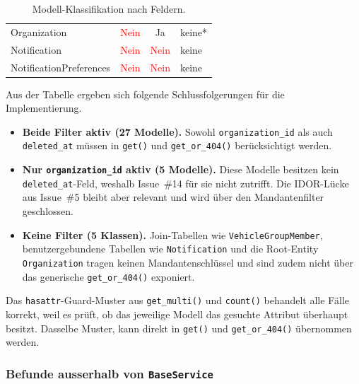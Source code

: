 \begin{table}[H]
\begin{center}
\begin{tabular}{|l|c|c|l|}
            Organization                  & \textcolor{red}{Nein}          & \textcolor{green!60!black}{Ja} & keine*                       \\
            Notification                  & \textcolor{red}{Nein}          & \textcolor{red}{Nein}          & keine                        \\
            NotificationPreferences       & \textcolor{red}{Nein}          & \textcolor{red}{Nein}          & keine                        \\
            \hline
        \end{tabular}
    \end{center}
    \caption{Modell-Klassifikation nach Feldern.}
    \label{tab:model_matrix}
\end{table}

Aus der Tabelle ergeben sich folgende Schlussfolgerungen für die
Implementierung.

\begin{itemize}
    \item \textbf{Beide Filter aktiv (27 Modelle).} Sowohl
          \texttt{organization\_id} als auch \texttt{deleted\_at} müssen in
          \texttt{get()} und \texttt{get\_or\_404()} berücksichtigt werden.
    \item \textbf{Nur \texttt{organization\_id} aktiv (5 Modelle).} Diese
          Modelle besitzen kein \texttt{deleted\_at}-Feld, weshalb Issue~\#14
          für sie nicht zutrifft. Die IDOR-Lücke aus Issue~\#5 bleibt aber
          relevant und wird über den Mandantenfilter geschlossen.
    \item \textbf{Keine Filter (5 Klassen).} Join-Tabellen wie
          \texttt{VehicleGroupMember}, benutzergebundene Tabellen wie
          \texttt{Notification} und die Root-Entity \texttt{Organization}
          tragen keinen Mandantenschlüssel und sind zudem nicht über das
          generische \texttt{get\_or\_404()} exponiert.
\end{itemize}

Das \texttt{hasattr}-Guard-Muster aus \texttt{get\_multi()} und \texttt{count()}
behandelt alle Fälle korrekt, weil es prüft, ob das jeweilige Modell das
gesuchte Attribut überhaupt besitzt. Dasselbe Muster, kann direkt in \texttt{get()} und \texttt{get\_or\_404()} übernommen werden.


\subsubsection{Befunde ausserhalb von \texttt{BaseService}}
\label{sec:befunde-ausserhalb-baseservice}

